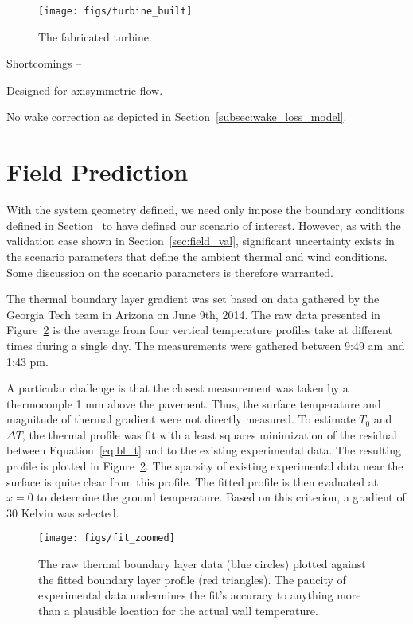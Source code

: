   \begin{figure}
   \centering
   \texttt{[image: figs/turbine\_built]}
   \caption{The fabricated turbine.} 
   \label{fig:turbine_built}
  \end{figure}

Shortcomings -- 

Designed for axisymmetric flow. 

No wake correction as depicted in Section~\ref{subsec:wake_loss_model}.    


\section{Field Prediction}
\label{subsec:field_predict}

With the system geometry defined, we need only impose the boundary
conditions defined in Section~\label{sec:bc} to have defined our
scenario of interest. However, as with the validation case shown in
Section~\ref{sec:field_val}, significant uncertainty exists in the
scenario parameters that define the ambient thermal and wind
conditions. Some discussion on the scenario parameters is therefore
warranted. 

The thermal boundary layer gradient was set based on data gathered by 
the Georgia Tech team in Arizona on June 9th, 2014. The raw data
presented in Figure~\ref{fig:thermal_profile_fit} is the average from
four vertical temperature profiles take at different times during a
single day. The measurements were gathered between 9:49 am and 1:43
pm\cite{ann_comm}.  

A particular challenge is that the closest measurement was taken by a 
thermocouple 1 mm above the pavement. Thus, the surface temperature and
magnitude of thermal gradient were not directly measured. To estimate
$T_0$ and $\Delta T$, the thermal profile was fit with a least squares
minimization of the residual between Equation~\ref{eq:bl_t} and to the
existing experimental data. The resulting profile is plotted in
Figure~\ref{fig:thermal_profile_fit}. The sparsity of existing
experimental data near the surface is quite clear from this
profile. The fitted profile is then evaluated at $x=0$ to determine the
ground temperature. Based on this criterion, a gradient of 30 Kelvin was
selected.   

 \begin{figure}[!htb]
  \begin{center}
   \texttt{[image: figs/fit\_zoomed]}
   \caption{The raw thermal boundary layer data (blue circles) plotted
   against the fitted boundary layer profile (red triangles). The
   paucity of experimental data undermines the fit's accuracy to
   anything more than a plausible location for the actual wall
   temperature. }  
   \label{fig:thermal_profile_fit}
  \end{center}
 \end{figure}

